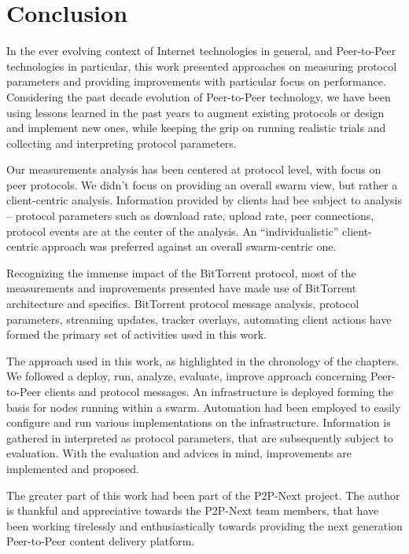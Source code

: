
\chapter{Conclusion}
\label{chapter:conclusion}

In the ever evolving context of Internet technologies in general, and
Peer-to-Peer technologies in particular, this work presented approaches on
measuring protocol parameters and providing improvements with particular focus
on performance. Considering the past decade evolution of Peer-to-Peer
technology, we have been using lessons learned in the past years to augment
existing protocols or design and implement new ones, while keeping the grip on
running realistic trials and collecting and interpreting protocol parameters.

Our measurements analysis has been centered at protocol level, with focus on
peer protocols. We didn't focus on providing an overall swarm view, but rather
a client-centric analysis. Information provided by clients had bee subject to
analysis -- protocol parameters such as download rate, upload rate, peer
connections, protocol events are at the center of the analysis. An
``individualistic'' client-centric approach was preferred against an overall
swarm-centric one.

Recognizing the immense impact of the BitTorrent protocol, most of the
measurements and improvements presented have made use of BitTorrent
architecture and specifics. BitTorrent protocol message analysis, protocol
parameters, streaming updates, tracker overlays, automating client actions
have formed the primary set of activities used in this work.

The approach used in this work, as highlighted in the chronology of the
chapters. We followed a deploy, run, analyze, evaluate, improve approach
concerning Peer-to-Peer clients and protocol messages. An infrastructure is
deployed forming the basis for nodes running within a swarm. Automation had
been employed to easily configure and run various implementations on the
infrastructure. Information is gathered in interpreted as protocol parameters,
that are subsequently subject to evaluation. With the evaluation and advices
in mind, improvements are implemented and proposed.

The greater part of this work had been part of the P2P-Next project. The
author is thankful and appreciative towards the P2P-Next team members, that
have been working tirelessly and enthusiastically towards providing the next
generation Peer-to-Peer content delivery platform.

